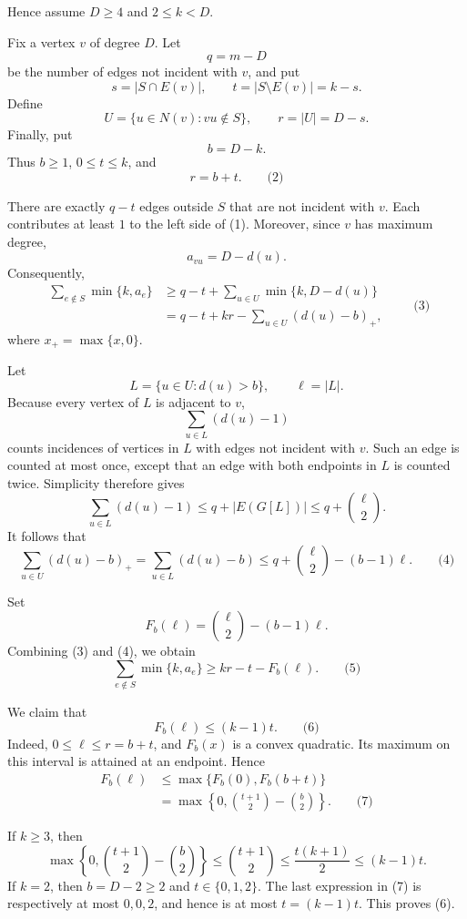 \documentclass[
  11pt,
  a4paper,
]{article}
\begin{document}
Hence assume \(D\ge4\) and \(2\le k<D\).

Fix a vertex \(v\) of degree \(D\). Let \[
q=m-D
\] be the number of edges not incident with \(v\), and put \[
s=|S\cap E(v)|,\qquad t=|S\setminus E(v)|=k-s.
\] Define \[
U=\{u\in N(v):vu\notin S\},\qquad r=|U|=D-s.
\] Finally, put \[
b=D-k.
\] Thus \(b\ge1\), \(0\le t\le k\), and \[
r=b+t. \qquad\text{(2)}
\]

There are exactly \(q-t\) edges outside \(S\) that are not incident with
\(v\). Each contributes at least \(1\) to the left side of (1).
Moreover, since \(v\) has maximum degree, \[
a_{vu}=D-d(u).
\] Consequently, \begin{equation*}
\begin{aligned}
\sum_{e\notin S}\min\{k,a_e\}
&\ge q-t+\sum_{u\in U}\min\{k,D-d(u)\}\\
&=q-t+kr-\sum_{u\in U}(d(u)-b)_+,
\end{aligned} \qquad\text{(3)}
\end{equation*} where \(x_+=\max\{x,0\}\).

Let \[
L=\{u\in U:d(u)>b\},\qquad \ell=|L|.
\] Because every vertex of \(L\) is adjacent to \(v\), \[
\sum_{u\in L}(d(u)-1)
\] counts incidences of vertices in \(L\) with edges not incident with
\(v\). Such an edge is counted at most once, except that an edge with
both endpoints in \(L\) is counted twice. Simplicity therefore gives \[
\sum_{u\in L}(d(u)-1)
\le q+|E(G[L])|
\le q+\binom{\ell}{2}.
\] It follows that \[
\sum_{u\in U}(d(u)-b)_+
=\sum_{u\in L}(d(u)-b)
\le q+\binom{\ell}{2}-(b-1)\ell. \qquad\text{(4)}
\]

Set \[
F_b(\ell)=\binom{\ell}{2}-(b-1)\ell.
\] Combining (3) and (4), we obtain \[
\sum_{e\notin S}\min\{k,a_e\}
\ge kr-t-F_b(\ell). \qquad\text{(5)}
\]

We claim that \[
F_b(\ell)\le (k-1)t. \qquad\text{(6)}
\] Indeed, \(0\le\ell\le r=b+t\), and \(F_b(x)\) is a convex quadratic.
Its maximum on this interval is attained at an endpoint. Hence
\begin{equation*}
\begin{aligned}
F_b(\ell)
&\le \max\{F_b(0),F_b(b+t)\}\\
&=\max\left\{0,\binom{t+1}{2}-\binom b2\right\}. \qquad\text{(7)}
\end{aligned}
\end{equation*}

If \(k\ge3\), then \[
\max\left\{0,\binom{t+1}{2}-\binom b2\right\}
\le \binom{t+1}{2}
\le \frac{t(k+1)}2
\le (k-1)t.
\] If \(k=2\), then \(b=D-2\ge2\) and \(t\in\{0,1,2\}\). The last
expression in (7) is respectively at most \(0,0,2\), and hence is at
most \(t=(k-1)t\). This proves (6).
\end{document}
